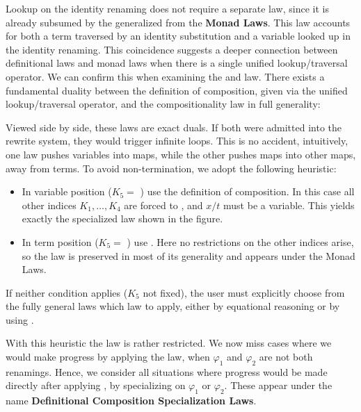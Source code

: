 \documentclass[screen,nonacm]{acmart}
\begin{document}
Lookup on the identity renaming does not require a separate law, since it is
already subsumed by the generalized  from the \textbf{Monad
      Laws}. This law accounts for both a term traversed by an identity substitution
and a variable looked up in the identity renaming. This coincidence suggests a
deeper connection between definitional laws and monad laws when there is a
single unified lookup/traversal operator. We can confirm this when examining
the  and  law. There exists a
fundamental duality between the definition of composition, given via the
unified lookup/traversal operator, and the compositionality law in full
generality:

\noindent\begin{minipage}{0.45\linewidth}
      \raggedright{}
      \ECompGeneral{}
\end{minipage}
\begin{minipage}{0.55\linewidth}
      \raggedright{}
      \ECompoGeneral{}
\end{minipage}

\noindent Viewed side by side, these laws are exact duals. If both were admitted into the
rewrite system, they would trigger infinite loops. This is no accident,
intuitively, one law pushes variables into maps, while the other pushes maps
into other maps, away from terms. To avoid non-termination, we adopt the following heuristic:
\begin{itemize}
      \item In variable position ($K_5 = $ ) use the definition of
            composition. In this case all other indices $K_1,\dots,K_4$ are forced to
            , and $x/t$ must be a variable. This yields exactly the
            specialized  law shown in the figure.
      \item In term position ($K_5 = $ ) use .
            Here no restrictions on the other indices arise, so the law is preserved in
            most of its generality and appears under the Monad Laws.
\end{itemize}

\noindent If neither condition applies ($K_5$ not fixed), the user must explicitly choose from the fully
general laws which law to apply, either by equational reasoning or by using
.

With this heuristic the  law is rather restricted. We now
miss cases where we would make progress by applying the 
law, when $\varphi_1$ and $\varphi_2$ are not both renamings. Hence, we
consider all situations where progress would be made directly after applying
, by specializing on $\varphi_1$ or $\varphi_2$. These
appear under the name \textbf{Definitional Composition Specialization Laws}.
\end{document}
